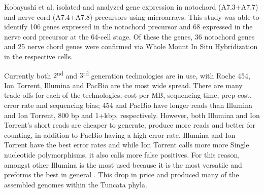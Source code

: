 Kobayashi et al. \cite{kobayashi_differential_2013} isolated and analyzed gene expression in notochord (A7.3+A7.7) and nerve cord (A7.4+A7.8) precursors using microarrays. This study was able to identify 106 genes expressed in the notochord precursor and 68 expressed in the nerve cord precursor at the 64-cell stage. Of these the genes, 36 notochord genes and 25 nerve chord genes were confirmed via Whole Mount In Situ Hybridization in the respective cells. 

Currently both $2$\textsuperscript{nd} and $3$\textsuperscript{rd} generation technologies are in use, with Roche 454, Ion Torrent, Illumina and PacBio are the most wide spread. There are many trade-offs for each of the technologies, cost per MB, sequencing time, prep cost, error rate and sequencing bias; 454 and PacBio have longer reads than Illumina and Ion Torrent, 800 bp and 1+kbp, respectively. However, both Illumina and Ion Torrent's short reads are cheaper to generate, produce more reads and better for counting, in addition to PacBio having a high error rate. Illumina and Ion Torrent have the best error rates and while Ion Torrent calls more more Single nucleotide polymorphisms, it also calls more false positives.  For this reason, amongst other Illumina is the most used because it is the most versatile and preforms the best in general \cite{glenn_field_2011,quail_tale_2012}. This drop in price and produced many of the assembled genomes within the Tuncata phyla. 
